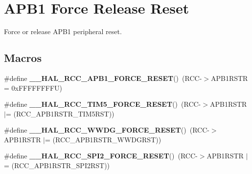 \hypertarget{group___r_c_c___a_p_b1___force___release___reset}{}\section{A\+P\+B1 Force Release Reset}
\label{group___r_c_c___a_p_b1___force___release___reset}


Force or release A\+P\+B1 peripheral reset.  


\subsection*{Macros}
\begin{DoxyCompactItemize}
\item 
\mbox{\label{group___r_c_c___a_p_b1___force___release___reset_ga6f6e7048eca1abd1be132027f5b79465}} 
\#define {\bfseries \+\_\+\+\_\+\+H\+A\+L\+\_\+\+R\+C\+C\+\_\+\+A\+P\+B1\+\_\+\+F\+O\+R\+C\+E\+\_\+\+R\+E\+S\+ET}()~(R\+CC-\/$>$A\+P\+B1\+R\+S\+TR = 0x\+F\+F\+F\+F\+F\+F\+F\+F\+U)
\item 
\mbox{\label{group___r_c_c___a_p_b1___force___release___reset_ga20ca12317dd14485d79902863aad063b}} 
\#define {\bfseries \+\_\+\+\_\+\+H\+A\+L\+\_\+\+R\+C\+C\+\_\+\+T\+I\+M5\+\_\+\+F\+O\+R\+C\+E\+\_\+\+R\+E\+S\+ET}()~(R\+CC-\/$>$A\+P\+B1\+R\+S\+TR $\vert$= (R\+C\+C\+\_\+\+A\+P\+B1\+R\+S\+T\+R\+\_\+\+T\+I\+M5\+R\+ST))
\item 
\mbox{\label{group___r_c_c___a_p_b1___force___release___reset_gaf60e74dcb0fdadafd6b4762aa81fc409}} 
\#define {\bfseries \+\_\+\+\_\+\+H\+A\+L\+\_\+\+R\+C\+C\+\_\+\+W\+W\+D\+G\+\_\+\+F\+O\+R\+C\+E\+\_\+\+R\+E\+S\+ET}()~(R\+CC-\/$>$A\+P\+B1\+R\+S\+TR $\vert$= (R\+C\+C\+\_\+\+A\+P\+B1\+R\+S\+T\+R\+\_\+\+W\+W\+D\+G\+R\+ST))
\item 
\mbox{\label{group___r_c_c___a_p_b1___force___release___reset_ga869e4f5c1132e3dfce084099cf454c51}} 
\#define {\bfseries \+\_\+\+\_\+\+H\+A\+L\+\_\+\+R\+C\+C\+\_\+\+S\+P\+I2\+\_\+\+F\+O\+R\+C\+E\+\_\+\+R\+E\+S\+ET}()~(R\+CC-\/$>$A\+P\+B1\+R\+S\+TR $\vert$= (R\+C\+C\+\_\+\+A\+P\+B1\+R\+S\+T\+R\+\_\+\+S\+P\+I2\+R\+ST))
\item 

\end{DoxyCompactItemize}
